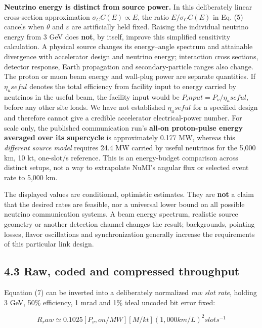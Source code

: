 \documentclass[
]{article}
\begin{document}
\textbf{Neutrino energy is distinct from source power.} In this
deliberately linear cross-section approximation
\({\sigma}_CC(E) \propto E\), the ratio \(E/{\sigma}_CC(E)\) in Eq. (5)
cancels when \({\theta}\) and \({\varepsilon}\) are artificially held
fixed. Raising the individual neutrino energy from 3 GeV does
\textbf{not}, by itself, improve this simplified sensitivity
calculation. A physical source changes its energy--angle spectrum and
attainable divergence with accelerator design and neutrino energy;
interaction cross sections, detector response, Earth propagation and
secondary-particle ranges also change. The proton or muon beam energy
and wall-plug power are separate quantities. If \(η_useful\) denotes the
total efficiency from facility input to energy carried by neutrinos in
the useful beam, the facility input would be
\(P_input = P_{\nu}/η_useful\), before any other site loads. We have not
established \(η_useful\) for a specified design and therefore cannot
give a credible accelerator electrical-power number. For scale only, the
published communication run's \textbf{all-on proton-pulse energy
averaged over its supercycle} is approximately 0.177 MW, whereas this
\emph{different source model} requires 24.4 MW carried by useful
neutrinos for the 5,000 km, 10 kt, one-slot/s reference. This is an
energy-budget comparison across distinct setups, not a way to
extrapolate NuMI's angular flux or selected event rate to 5,000 km.

The displayed values are conditional, optimistic estimates. They are
\textbf{not} a claim that the desired rates are feasible, nor a
universal lower bound on all possible neutrino communication systems. A
beam energy spectrum, realistic source geometry or another detection
channel changes the result; backgrounds, pointing losses, flavor
oscillations and synchronization generally increase the requirements of
this particular link design.

\hypertarget{raw-coded-and-compressed-throughput}{%
\subsection{4.3 Raw, coded and compressed
throughput}\label{raw-coded-and-compressed-throughput}}

Equation (7) can be inverted into a deliberately normalized \emph{raw
slot rate}, holding 3 GeV, 50\% efficiency, 1 mrad and 1\% ideal uncoded
bit error fixed:

\[
R_raw ≃ 0.1025 [P_ν,on/MW] [M/kt] (1,000 km/L)^{2} slot s^{-1} \tag{7}
\]
\end{document}
